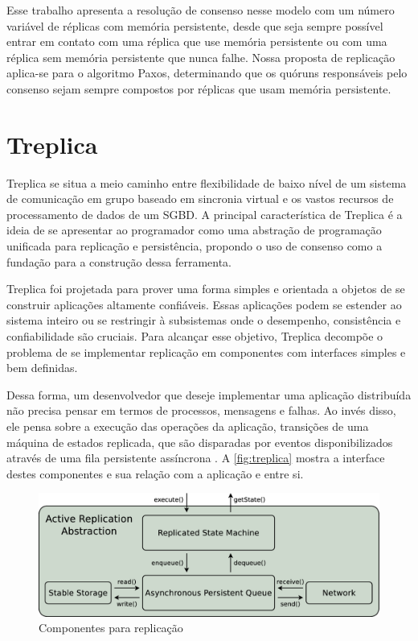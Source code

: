 Esse trabalho apresenta a resolução de consenso nesse modelo com um número variável de
réplicas com memória persistente, desde que seja sempre possível entrar em contato com
uma réplica que use memória persistente ou com uma réplica sem memória persistente que
nunca falhe. Nossa proposta de replicação aplica-se para o algoritmo Paxos, determinando
que os quóruns responsáveis pelo consenso sejam sempre compostos por réplicas que usam
memória persistente.


\section{Treplica}\label{sec:treplica}

Treplica se situa a meio caminho entre flexibilidade de baixo nível de um sistema de
comunicação em grupo \cite{birman93} baseado em sincronia virtual \cite{friedman96,
birman05} e os vastos recursos de processamento de dados de um SGBD. A principal
característica de Treplica é a ideia de se apresentar ao programador como uma abstração de
programação unificada para replicação e persistência, propondo o uso de consenso
\cite{barborak93} como a fundação para a construção dessa ferramenta.

Treplica foi projetada para prover uma forma simples e orientada a objetos de se construir
aplicações altamente confiáveis. Essas aplicações podem se estender ao sistema inteiro ou
se restringir à subsistemas onde o desempenho, consistência e confiabilidade são cruciais.
Para alcançar esse objetivo, Treplica decompõe o problema de se implementar replicação em
componentes com interfaces simples e bem definidas.

Dessa forma, um desenvolvedor que deseje implementar uma aplicação distribuída não precisa
pensar em termos de processos, mensagens e falhas. Ao invés disso, ele pensa sobre a
execução das operações da aplicação, transições de uma máquina de estados replicada, que
são disparadas por eventos disponibilizados através de uma fila persistente assíncrona
\cite{vieira-tr10b}. A \autoref{fig:treplica} mostra a interface destes componentes e sua
relação com a aplicação e entre si.

\begin{figure}[ht]
  \begin{center}
    \includegraphics[width=14cm]{conteudo/capitulos/figuras/treplica.eps}
  \end{center}
  \caption{Componentes para replicação}
  \label{fig:treplica}
\end{figure}

